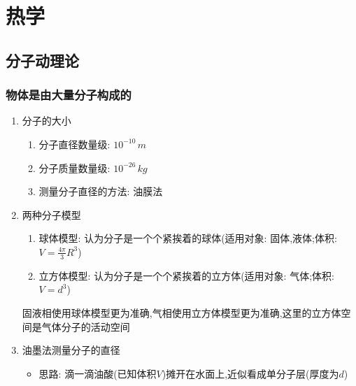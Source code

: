 \documentclass{article}
\begin{document}
\vspace{2em}
\newpage

\section{热学}
\subsection{分子动理论}
\subsubsection{物体是由大量分子构成的}
\begin{enumerate}
    \item 分子的大小
          \begin{enumerate}[label = (\arabic*{})]
              \item 分子直径数量级: $10^{-10} \, m$
              \item 分子质量数量级: $10^{-26} \, kg$
              \item 测量分子直径的方法: 油膜法
          \end{enumerate}

          \vspace{2em}

    \item 两种分子模型
          \begin{enumerate}[label = (\arabic*{})]
              \item 球体模型: 认为分子是一个个紧挨着的球体(适用对象: 固体,液体;体积:$V = \frac{4\pi}{3} R^{3}$)
              \item 立方体模型: 认为分子是一个个紧挨着的立方体(适用对象: 气体;体积:$V = d^{3}$)
          \end{enumerate}

          \vspace{-1em}
          \hspace{1em}\begin{adjustbox}{minipage=0.86\linewidth, bgcolor=gray!20, padding=1em}
              \small
              固液相使用球体模型更为准确,气相使用立方体模型更为准确,这里的立方体空间是气体分子的活动空间
          \end{adjustbox}
          \vspace{-1em}

          \vspace{2em}

    \item 油墨法测量分子的直径
          \begin{itemize}
              \item 思路: 滴一滴油酸(已知体积$V$)摊开在水面上,近似看成单分子层(厚度为$d$)


\end{itemize}
\end{enumerate}
\end{document}
